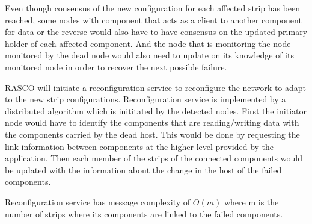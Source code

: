 Even though consensus of the new configuration for each affected strip has been
reached, some nodes with component that acts as a client to another component
for data or the reverse would also have to have consensus on the updated
primary holder of each affected component. And the node that is monitoring the
node monitored by the dead node would also need to update on its knowledge of
its monitored node in order to recover the next possible failure.

RASCO will initiate a reconfiguration service to reconfigure the network to adapt
to the new strip configurations. Reconfiguration service is implemented by
a distributed algorithm which is inititated by the detected nodes. First the
initiator node would have to identify the components that are reading/writing
data with the components carried by the dead host. This would be done by
requesting the link information between components at the higher level provided
by the application. Then each member of the strips of the connected components
would be updated with the information about the change in the host of the
failed components.

Reconfiguration service has message complexity of $O(m)$ where m is the
number of strips where its components are linked to the failed components.


